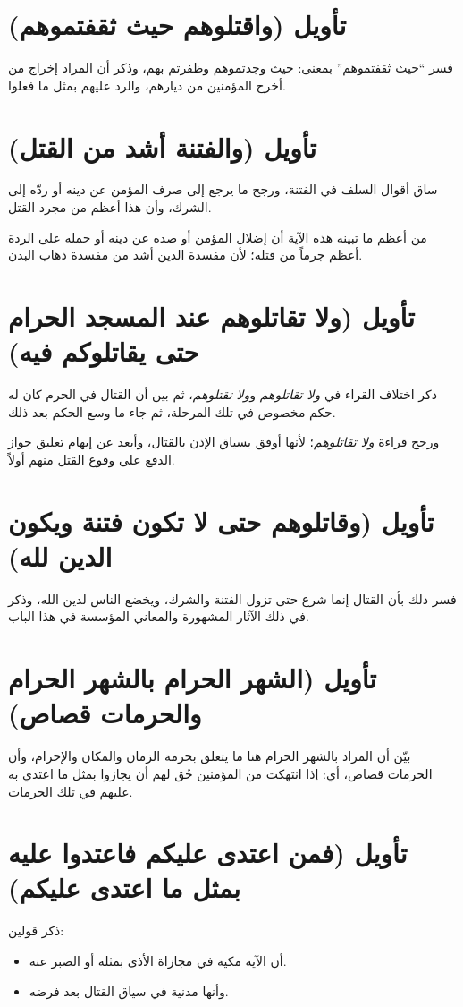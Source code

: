 \section{تأويل (واقتلوهم حيث ثقفتموهم)}
فسر  ``حيث ثقفتموهم'' بمعنى: حيث وجدتموهم وظفرتم بهم، وذكر أن المراد إخراج من أخرج المؤمنين من ديارهم، والرد عليهم بمثل ما فعلوا.

\section{تأويل (والفتنة أشد من القتل)}
ساق  أقوال السلف في الفتنة، ورجح ما يرجع إلى صرف المؤمن عن دينه أو ردّه إلى الشرك، وأن هذا أعظم من مجرد القتل.

\begin{fawaid}
من أعظم ما تبينه هذه الآية أن إضلال المؤمن أو صده عن دينه أو حمله على الردة أعظم جرماً من قتله؛ لأن مفسدة الدين أشد من مفسدة ذهاب البدن.
\end{fawaid}

\section{تأويل (ولا تقاتلوهم عند المسجد الحرام حتى يقاتلوكم فيه)}
ذكر  اختلاف القراء في \textit{ولا تقاتلوهم} و\textit{ولا تقتلوهم}، ثم بين أن القتال في الحرم كان له حكم مخصوص في تلك المرحلة، ثم جاء ما وسع الحكم بعد ذلك.

ورجح  قراءة \textit{ولا تقاتلوهم}؛ لأنها أوفق بسياق الإذن بالقتال، وأبعد عن إيهام تعليق جواز الدفع على وقوع القتل منهم أولاً.

\section{تأويل (وقاتلوهم حتى لا تكون فتنة ويكون الدين لله)}
فسر  ذلك بأن القتال إنما شرع حتى تزول الفتنة والشرك، ويخضع الناس لدين الله، وذكر في ذلك الآثار المشهورة والمعاني المؤسسة في هذا الباب.

\section{تأويل (الشهر الحرام بالشهر الحرام والحرمات قصاص)}
بيّن  أن المراد بالشهر الحرام هنا ما يتعلق بحرمة الزمان والمكان والإحرام، وأن الحرمات قصاص، أي: إذا انتهكت من المؤمنين حُق لهم أن يجازوا بمثل ما اعتدي به عليهم في تلك الحرمات.

\section{تأويل (فمن اعتدى عليكم فاعتدوا عليه بمثل ما اعتدى عليكم)}
ذكر  قولين:
\begin{itemize}
    \item أن الآية مكية في مجازاة الأذى بمثله أو الصبر عنه.
    \item وأنها مدنية في سياق القتال بعد فرضه.
\end{itemize}

